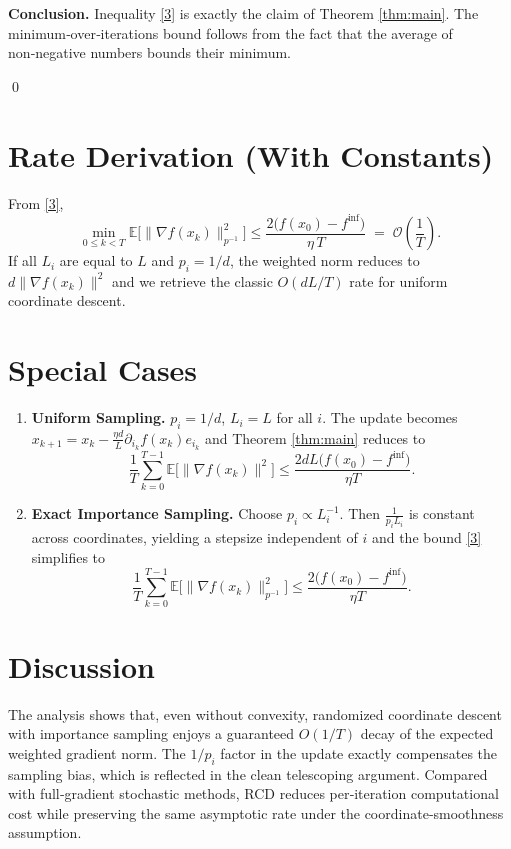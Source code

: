 \documentclass{article}
\newcommand{\E}{\mathbb{E}}
\begin{document}
\noindent\textbf{Conclusion.} Inequality \eqref{3} is exactly the claim of Theorem \ref{thm:main}. The minimum‑over‑iterations bound follows from the fact that the average of non‑negative numbers bounds their minimum.

\qed

\section*{Rate Derivation (With Constants)}
From \eqref{3},
\[
\min_{0\le k<T}\E\!\big[\|\nabla f(x_k)\|_{p^{-1}}^{2}\big]
\le \frac{2\big(f(x_0)-f^{\inf}\big)}{\eta\,T}
\;=\;
\mathcal{O}\!\left(\frac{1}{T}\right).
\]
If all $L_i$ are equal to $L$ and $p_i=1/d$, the weighted norm reduces to $d\|\nabla f(x_k)\|^{2}$ and we retrieve the classic $O(dL/T)$ rate for uniform coordinate descent.

\section*{Special Cases}
\begin{enumerate}[leftmargin=*]
\item \textbf{Uniform Sampling.} $p_i=1/d$, $L_i=L$ for all $i$.
    The update becomes $x_{k+1}=x_k-\frac{\eta d}{L}\partial_{i_k}f(x_k)e_{i_k}$ and
    Theorem \ref{thm:main} reduces to
    \[
    \frac{1}{T}\sum_{k=0}^{T-1}\E\!\big[\|\nabla f(x_k)\|^{2}\big]\le
    \frac{2dL\big(f(x_0)-f^{\inf}\big)}{\eta T}.
    \]
\item \textbf{Exact Importance Sampling.} Choose $p_i\propto L_i^{-1}$.
    Then $\frac{1}{p_i L_i}$ is constant across coordinates, yielding a
    stepsize independent of $i$ and the bound \eqref{3} simplifies to
    \[
    \frac{1}{T}\sum_{k=0}^{T-1}\E\!\big[\|\nabla f(x_k)\|_{p^{-1}}^{2}\big]
    \le \frac{2\big(f(x_0)-f^{\inf}\big)}{\eta T}.
    \]
\end{enumerate}

\section*{Discussion}
The analysis shows that, even without convexity, randomized coordinate descent with importance sampling enjoys a guaranteed $O(1/T)$ decay of the expected weighted gradient norm. The $1/p_i$ factor in the update exactly compensates the sampling bias, which is reflected in the clean telescoping argument. Compared with full‑gradient stochastic methods, RCD reduces per‑iteration computational cost while preserving the same asymptotic rate under the coordinate‑smoothness assumption.
\end{document}
